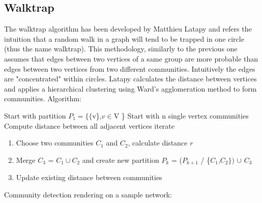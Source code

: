 \documentclass[11pt]{article}       %
\begin{document}
\subsection{Walktrap}
The walktrap algorithm has been developed by Matthieu Latapy \cite{Walktrap} and refers the intuition that a random walk in a graph will tend to be trapped in one circle (thus the name walktrap). This methodology, similarly to the previous one assumes that edges between two vertices of a same group are more probable than edges between two vertices from two different communities. Intuitively the edges are "concentrated" within circles.
Latapy calculates the distance between vertices and applies a hierarchical clustering using Ward's agglomeration method to form communities. 
\newline    
Algorithm:
\begin{center}
\fbox
{\parbox{15cm}{
Start with partition $P_{1} = \{\{$v\},$v \in $V \} \newline
Start with n single vertex communities \newline
Compute distance between all adjacent vertices \newline
iterate
\begin{enumerate}
\item Choose two communities $C_{1}$ and $C_{2}$, calculate distance $r$
\item Merge $C_{3}$ = $C_{1}\cup  C_{2}$ and create new partition $P_{k}$ = ($P_{k+1}$ / \{$C_{1}$,$C_{2}\})$ $\cup$  $C_{3}$
\item Update existing distance between communities
\end{enumerate}
}}
\end{center}
\newline
Community detection rendering on a sample network:
\end{document}
